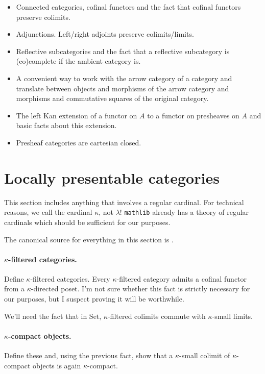\documentclass{article}
\theoremstyle{definition}
\theoremstyle{plain}
\newcommand{\mathlib}{\texttt{mathlib}}
\newcommand{\Set}{\mathrm{Set}}
\begin{document}
\begin{itemize}
\item Connected categories, cofinal functors and the fact that cofinal functors preserve colimits.
\item Adjunctions.
  Left/right adjoints preserve colimits/limits.
\item Reflective subcategories and the fact that a reflective subcategory is (co)complete if the ambient category is.
\item A convenient way to work with the arrow category of a category and translate between objects and morphisms of the arrow category and morphisms and commutative squares of the original category.
\item The left Kan extension of a functor on $A$ to a functor on presheaves on $A$ and basic facts about this extension.
\item Presheaf categories are cartesian closed.
\end{itemize}

\section{Locally presentable categories}

This section includes anything that involves a regular cardinal.
For technical reasons, we call the cardinal $\kappa$, not $\lambda$!
\mathlib{} already has a theory of regular cardinals which should be sufficient for our purposes.

The canonical source for everything in this section is \cite{AR}.

\paragraph{$\kappa$-filtered categories.}
Define $\kappa$-filtered categories.
Every $\kappa$-filtered category admits a cofinal functor from a $\kappa$-directed poset.
I'm not sure whether this fact is strictly necessary for our purposes, but I suspect proving it will be worthwhile.

We'll need the fact that in $\Set$, $\kappa$-filtered colimits commute with $\kappa$-small limits.

\paragraph{$\kappa$-compact objects.}
Define these and, using the previous fact, show that a $\kappa$-small colimit of $\kappa$-compact objects is again $\kappa$-compact.
\end{document}
